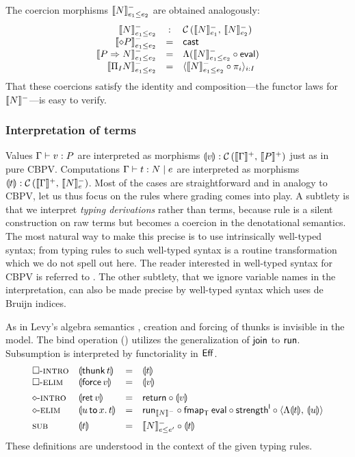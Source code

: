 \documentclass[acmsmall,review,anonymous]{acmart}\settopmatter{printfolios=true,printccs=false,printacmref=false}
\newcommand{\graybox}[1]{\grayboxtext{$#1$}}
\begin{document}
The coercion morphisms $\Denn N {e_1 \leq e_2}$ are obtained
analogously:
\[
\begin{array}{rcl}
  \Denn N {e_1 \leq e_2} & : & \Hom {\Denn N {e_1}} {\Denn N {e_2}} \\
  \Denn {\diamond P} {e_1 \leq e_2} & = & \tcast \\
  \Denn {P \To N}   {e_1 \leq e_2} & = &
    \Lambda(\Denn N {e_1 \leq e_2} \comp \teval) \\
  \Denn {\rect I N} {e_1 \leq e_2} & = &
    \langle \Denn N {e_1 \leq e_2} \comp \pi_i {} \rangle_{i:I} \\
\end{array}
\]
That these coercions satisfy the identity and composition---the functor
laws for $\denn N$---is easy to verify.

\subsubsection{Interpretation of terms}

Values $\ValTy \Gamma v P$ are interpreted as morphisms $\dent v :
\Hom {\denp \Gamma} {\denp P}$ just as in pure CBPV.  Computations
$\CompTy \Gamma t e N$ are interpreted as morphisms $\dent t : \Hom
{\denp \Gamma} {\Denn N e}$.  Most of the cases are straightforward
and in analogy to CBPV, let us thus focus on the
\graybox{\mbox{modified}} rules where grading comes into play.  A
subtlety is that we interpret \emph{typing derivations} rather than terms,
because rule \rsub is a silent construction on raw terms but becomes a
coercion in the denotational semantics.  The most natural way to make
this precise is to use intrinsically well-typed syntax; from typing
rules to such well-typed syntax is a routine transformation which we
do not spell out here.  The reader interested in well-typed syntax for
CBPV is referred to \citet{abelSattler:ppdp19}.
The other subtlety, that we ignore variable names in the
interpretation, can also be made precise by well-typed syntax which
uses de Bruijn indices.

As in Levy's algebra semantics \citeyearpar{levy:hosc06}, creation and
forcing of thunks is invisible in the model.  The bind operation
(\relim\diamond) utilizes the generalization of $\tjoin$ to $\trun$.
Subsumption is interpreted by functoriality in $\Eff$.
\[
\begin{array}{llcl}
\rintro\Box & \dent{\thunk t} & = & \dent t \\
\relim\Box  & \dent{\force v} & = & \dent v
\\[1ex]
\rintro\diamond & \dent{\ret v} & = & \treturn \comp \dent v \\
\relim\diamond  & \dent{\bind x u t} & = &
  \run[\denn N] \comp \fmap[\T]\teval \comp \strengthl \comp
  \langle \Lambda\dent t,\,\dent u \rangle
\\[1ex]
\rsub & \dent t & = & \Denn N {e \leq e'} \comp \dent t
\\
\end{array}
\]
These definitions are understood in the context of the given typing rules.
\end{document}
